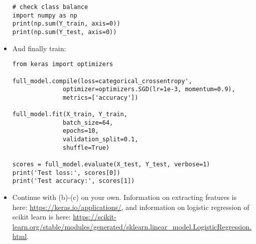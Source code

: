 \begin{itemize}
\begin{code}
\begin{Verbatim}
# check class balance
import numpy as np
print(np.sum(Y_train, axis=0))
print(np.sum(Y_test, axis=0))
\end{Verbatim}
\end{code}

\item And finally train:
\begin{code}
\begin{Verbatim}
from keras import optimizers

full_model.compile(loss=categorical_crossentropy',
              optimizer=optimizers.SGD(lr=1e-3, momentum=0.9),
              metrics=['accuracy'])

full_model.fit(X_train, Y_train,
              batch_size=64,
              epochs=10,
              validation_split=0.1,
              shuffle=True)

scores = full_model.evaluate(X_test, Y_test, verbose=1)
print('Test loss:', scores[0])
print('Test accuracy:', scores[1])
\end{Verbatim}
\end{code}

\item Continue with (b)-(c) on your own. Information on extracting features is here: \url{https://keras.io/applications/}, and information on logistic regression of scikit learn is here: \url{https://scikit-learn.org/stable/modules/generated/sklearn.linear_model.LogisticRegression.html}.
\end{itemize}

\exerfoot
